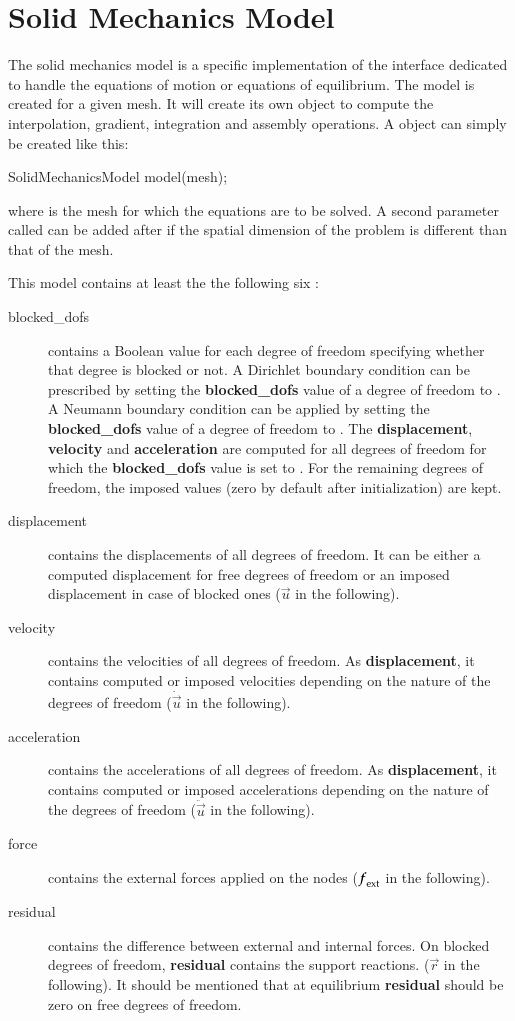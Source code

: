 \chapter{Solid Mechanics Model\label{sect:smm}}

The solid mechanics model is a specific implementation of the
 interface dedicated to handle the equations of motion or
equations of equilibrium. The model is created for a given mesh.  It
will create its own  object to compute the interpolation,
gradient, integration and assembly operations.  A
 object can simply be created like this:
\begin{cpp}
  SolidMechanicsModel model(mesh);
\end{cpp}
where  is the mesh for which the equations are to be
solved. A second parameter called  can be
added after  if the spatial dimension of the problem is
different than that of the mesh.

This model contains at least the the following six :
\begin{description}
\item[blocked\_dofs] contains a Boolean value for each degree of
  freedom specifying whether that degree is blocked or not. A
  Dirichlet boundary condition can be prescribed by setting the
  \textbf{blocked\_dofs} value of a degree of freedom to .
  A Neumann boundary condition can be applied by setting the
  \textbf{blocked\_dofs} value of a degree of freedom to .
  The \textbf{displacement}, \textbf{velocity} and
  \textbf{acceleration} are computed for all degrees of freedom for
  which the \textbf{blocked\_dofs} value is set to . For
  the remaining degrees of freedom, the imposed values (zero by
  default after initialization) are kept.
\item[displacement] contains the displacements of all degrees of
  freedom. It can be either a computed displacement for free degrees
  of freedom or an imposed displacement in case of blocked ones
  ($\vec{u}$ in the following).
\item[velocity] contains the velocities of all degrees of freedom.  As
  \textbf{displacement}, it contains computed or imposed velocities
  depending on the nature of the degrees of freedom ($\dot{\vec{u}}$
  in the following).
\item[acceleration] contains the accelerations of all degrees of
  freedom. As \textbf{displacement}, it contains computed or imposed
  accelerations depending on the nature of the degrees of freedom
  ($\ddot{\vec{u}}$ in the following).
\item[force] contains the external forces applied on the nodes
  ($\boldsymbol{f}_{{\mathrm{ext}}}$ in the following).
\item[residual] contains the difference between external and internal
  forces. On blocked degrees of freedom, \textbf{residual} contains
  the support reactions.  ($\vec{r}$ in the following).  It should be
  mentioned that at equilibrium \textbf{residual} should be zero on
  free degrees of freedom.
\end{description}

